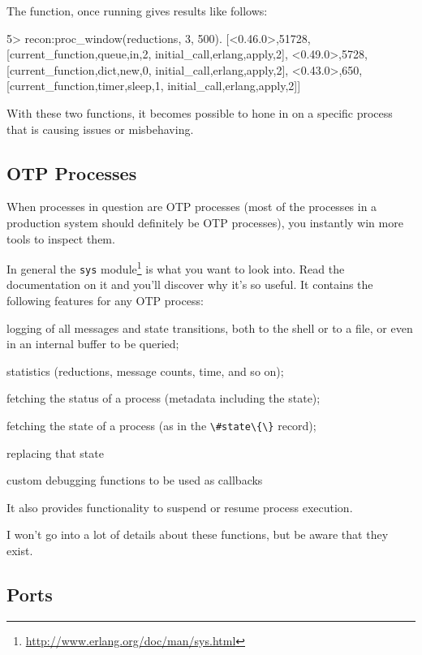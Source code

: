 \documentclass[11pt, oneside]{book}   	%
\newcommand{\module}[1]{\Verb`#1`}
\newcommand{\expression}[1]{\Verb`#1`}
\begin{document}
The function, once running gives results like follows:

\begin{VerbatimEshell}
5> recon:proc_window(reductions, 3, 500).
[{<0.46.0>,51728,
  [{current_function,{queue,in,2}},
   {initial_call,{erlang,apply,2}}]},
 {<0.49.0>,5728,
  [{current_function,{dict,new,0}},
   {initial_call,{erlang,apply,2}}]},
 {<0.43.0>,650,
  [{current_function,{timer,sleep,1}},
   {initial_call,{erlang,apply,2}}]}]
\end{VerbatimEshell}

With these two functions, it becomes possible to hone in on a specific process that is causing issues or misbehaving.


\subsection{OTP Processes}

When processes in question are OTP processes (most of the processes in a production system should definitely be OTP processes), you instantly win more tools to inspect them.

In general the \module{sys} module\footnote{\href{http://www.erlang.org/doc/man/sys.html}{http://www.erlang.org/doc/man/sys.html}} is what you want to look into. Read the documentation on it and you'll discover why it's so useful. It contains the following features for any OTP process:

\begin{itemize*}
	\item logging of all messages and state transitions, both to the shell or to a file, or even in an internal buffer to be queried;
	\item statistics (reductions, message counts, time, and so on);
	\item fetching the status of a process (metadata including the state);
	\item fetching the state of a process (as in the \expression{\#state\{\}} record);
	\item replacing that state
	\item custom debugging functions to be used as callbacks
\end{itemize*}

It also provides functionality to suspend or resume process execution.

I won't go into a lot of details about these functions, but be aware that they exist.

\subsection{Ports}
\end{document}
